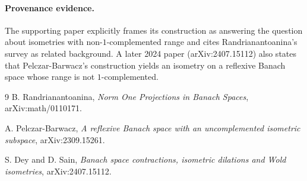 \documentclass[11pt]{article}
\begin{document}
\paragraph{Provenance evidence.}
The supporting paper explicitly frames its construction as answering the
question about isometries with non-\(1\)-complemented range and cites
Randrianantoanina's survey as related background.  A later 2024 paper
(arXiv:2407.15112) also states that Pelczar-Barwacz's construction yields an
isometry on a reflexive Banach space whose range is not \(1\)-complemented.

\begin{thebibliography}{9}
B. Randrianantoanina,
\emph{Norm One Projections in Banach Spaces},
arXiv:math/0110171.

A. Pelczar-Barwacz,
\emph{A reflexive Banach space with an uncomplemented isometric subspace},
arXiv:2309.15261.

S. Dey and D. Sain,
\emph{Banach space contractions, isometric dilations and Wold isometries},
arXiv:2407.15112.
\end{thebibliography}
\end{document}
